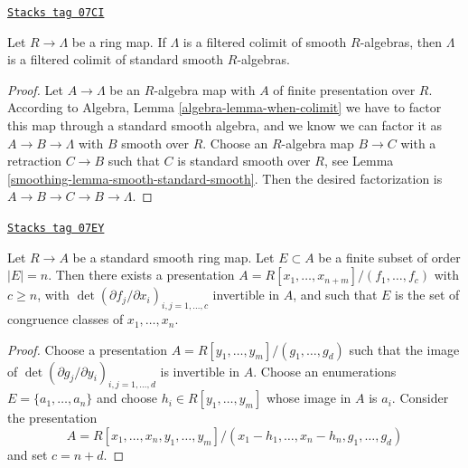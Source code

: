 \begin{lemma}
\label{smoothing-lemma-colimit-standard-smooth}
\href{https://stacks.math.columbia.edu/tag/07CI}{\texttt{Stacks tag 07CI}}

Let $R \to \Lambda$ be a ring map. If $\Lambda$ is a filtered colimit of
smooth $R$-algebras, then $\Lambda$ is a filtered colimit of standard
smooth $R$-algebras.
\end{lemma}

\begin{proof}

Let $A \to \Lambda$ be an $R$-algebra map with $A$
of finite presentation over $R$. According to
Algebra, Lemma \ref{algebra-lemma-when-colimit}
we have to factor this map through a standard smooth algebra, and
we know we can factor it as $A \to B \to \Lambda$ with $B$ smooth
over $R$. Choose an $R$-algebra map $B \to C$ with a retraction
$C \to B$ such that $C$ is standard smooth over $R$, see
Lemma \ref{smoothing-lemma-smooth-standard-smooth}.
Then the desired factorization is $A \to B \to C \to B \to \Lambda$.
\end{proof}

\begin{lemma}
\label{smoothing-lemma-standard-smooth-include-generators}
\href{https://stacks.math.columbia.edu/tag/07EY}{\texttt{Stacks tag 07EY}}

Let $R \to A$ be a standard smooth ring map.
Let $E \subset A$ be a finite subset of order $|E| = n$.
Then there exists a presentation
$A = R[x_1, \ldots, x_{n + m}]/(f_1, \ldots, f_c)$ with $c \geq n$,
with $\det(\partial f_j/\partial x_i)_{i, j = 1, \ldots, c}$
invertible in $A$, and such that $E$ is the set of congruence classes of
$x_1, \ldots, x_n$.
\end{lemma}

\begin{proof}
Choose a presentation $A = R[y_1, \ldots, y_m]/(g_1, \ldots, g_d)$
such that the image of
$\det(\partial g_j/\partial y_i)_{i, j = 1, \ldots, d}$
is invertible in $A$. Choose an enumerations $E = \{a_1, \ldots, a_n\}$
and choose $h_i \in R[y_1, \ldots, y_m]$ whose image in $A$ is $a_i$.
Consider the presentation
$$
A = R[x_1, \ldots, x_n, y_1, \ldots, y_m]/
(x_1 - h_1, \ldots, x_n - h_n, g_1, \ldots, g_d)
$$
and set $c = n + d$.
\end{proof}

